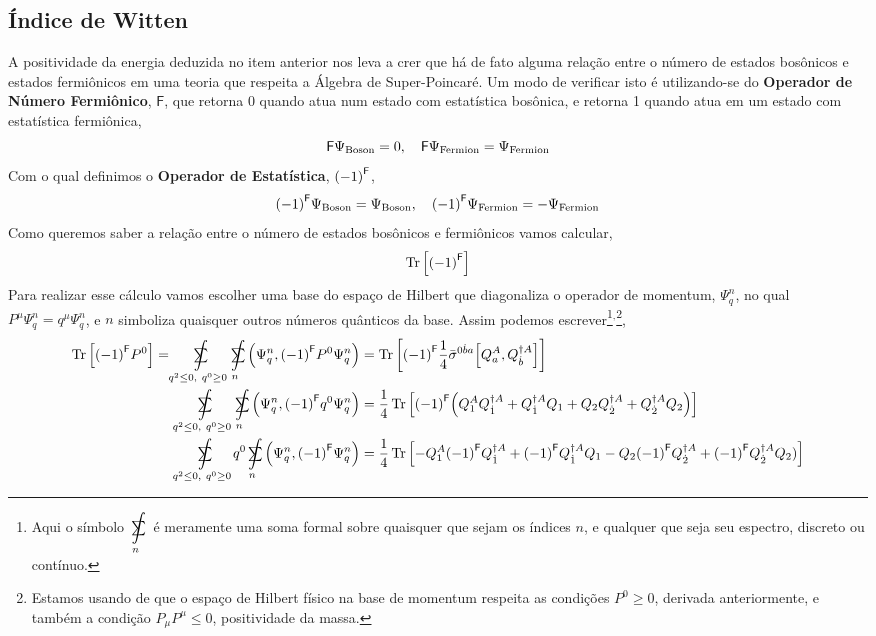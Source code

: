 \subsection{Índice de Witten}
A positividade da energia deduzida no item anterior nos leva a crer que há de fato alguma relação entre o 
número de estados bosônicos e estados fermiônicos em uma teoria que respeita a Álgebra de Super-Poincaré. 
Um modo de verificar isto é utilizando-se do \textbf{Operador de Número Fermiônico}, $\mathsf F$, que retorna 
0 quando atua num estado com estatística bosônica, e retorna 1 quando atua em um estado com estatística 
fermiônica,\[\mathsf F\Psi_{\textnormal{Boson}}=0,\ \ \ \mathsf F\Psi_{\textnormal{Fermion}}=\Psi_{\textnormal{Fermion}}\]
Com o qual definimos o \textbf{Operador de Estatística}, $\qty(-1)^{\mathsf F}$,
\[\qty(-1)^{\mathsf F}\Psi_{\textnormal{Boson}}=\Psi_{\textnormal{Boson}},\ \ \ \qty(-1)^{\mathsf F}\Psi_{\textnormal{Fermion}}=-\Psi_{\textnormal{Fermion}}\]
Como queremos saber a relação entre o número de estados bosônicos e fermiônicos vamos calcular, \[\Tr\qty[\qty(-1)^{\mathsf F}]\] 
Para realizar esse cálculo vamos escolher uma base 
do espaço de Hilbert que diagonaliza o operador de momentum, $\Psi_{q}^n$, no qual $P^\mu\Psi_{q}^n=q^\mu\Psi_{q}^n$, 
e $n$ simboliza quaisquer outros números quânticos da base. Assim podemos escrever\footnote{Aqui 
o símbolo $\ \ \mathclap{\displaystyle\int\limits_n}\mathclap{\textstyle\sum}\ \ $ é meramente uma soma formal sobre 
quaisquer que sejam os índices $n$, e qualquer que seja seu espectro, discreto ou contínuo.}$^{,}$\footnote{Estamos usando de que o espaço de Hilbert 
físico na base de momentum respeita as condições $P^0\geq 0$, derivada anteriormente, e também a condição $P_\mu P^\mu\leq 0$, positividade da massa.},
\begin{align*}
    \Tr\qty[\qty(-1)^{\mathsf F}P^0]=\ \ \ \ \ \ \mathclap{\displaystyle\int\limits_{q^2\leq 0,\ q^0\geq 0}}\mathclap{\textstyle\sum}\ \ \ \ \ \ \ \ \mathclap{\displaystyle\int\limits_n}\mathclap{\textstyle\sum}\ \ \qty(\Psi^n_q,\qty(-1)^{\mathsf F} P^0\Psi^n_q)&=\Tr\qty[\qty(-1)^{\mathsf F}\frac14{\bar\sigma}^{0 \dot b a}\comm{Q^A_a}{Q^{\dagger A}_{\dot b}}]\\
    \ \ \ \ \ \ \mathclap{\displaystyle\int\limits_{q^2\leq 0,\ q^0\geq 0}}\mathclap{\textstyle\sum}\ \ \ \ \ \ \ \ \mathclap{\displaystyle\int\limits_n}\mathclap{\textstyle\sum}\ \ \qty(\Psi^n_q,\qty(-1)^{\mathsf F} q^0\Psi^n_q)&=\frac14\Tr\qty[\qty(-1)^{\mathsf F}\qty(Q_1^AQ^{\dagger A}_{\dot 1}+Q^{\dagger A}_{\dot 1}Q_1+Q_2Q^{\dagger A}_{\dot 2}+Q^{\dagger A}_{\dot 2}Q_2)]\\
    \ \ \ \ \ \ \mathclap{\displaystyle\int\limits_{q^2\leq 0,\ q^0\geq 0}}\mathclap{\textstyle\sum}\ \ \ \ \ \ q^0\ \ \mathclap{\displaystyle\int\limits_n}\mathclap{\textstyle\sum}\ \ \qty(\Psi^n_q,\qty(-1)^{\mathsf F} \Psi^n_q)&=\frac14\Tr\qty[-Q_1^A\qty(-1)^{\mathsf F}Q^{\dagger A}_{\dot 1}+\qty(-1)^{\mathsf F}Q^{\dagger A}_{\dot 1}Q_1-Q_2\qty(-1)^{\mathsf F}Q^{\dagger A}_{\dot 2}+\qty(-1)^{\mathsf F}Q^{\dagger A}_{\dot 2}Q_2)]
\end{align*}
